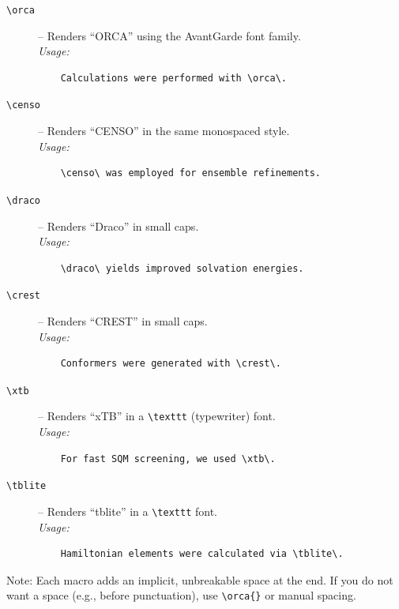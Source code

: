 \documentclass[a4paper,12pt]{article}
\begin{document}
\begin{description}
  \item[\texttt{\textbackslash orca}]  – Renders ``ORCA'' using the AvantGarde font family.\\
    \textit{Usage:} 
    \begin{verbatim}
    Calculations were performed with \orca\.
    \end{verbatim}

  \item[\texttt{\textbackslash censo}] – Renders “CENSO” in the same monospaced style.\\
    \textit{Usage:} 
    \begin{verbatim}
    \censo\ was employed for ensemble refinements.
    \end{verbatim}

    \item[\texttt{\textbackslash draco}] – Renders “Draco” in small caps.\\
    \textit{Usage:}
    \begin{verbatim}
    \draco\ yields improved solvation energies.
    \end{verbatim}

    \item[\texttt{\textbackslash crest}] – Renders “CREST” in small caps.\\
    \textit{Usage:}
    \begin{verbatim}
    Conformers were generated with \crest\.
    \end{verbatim}

    \item[\texttt{\textbackslash xtb}]   – Renders “xTB” in a \verb|\texttt| (typewriter) font.\\
    \textit{Usage:}
    \begin{verbatim}
    For fast SQM screening, we used \xtb\.
    \end{verbatim}

    \item[\texttt{\textbackslash tblite}] – Renders “tblite” in a \verb|\texttt| font.\\
    \textit{Usage:}
    \begin{verbatim}
    Hamiltonian elements were calculated via \tblite\.
    \end{verbatim}
\end{description}

\noindent Note: Each macro adds an implicit, unbreakable space at the end. If you do not want a space (e.g., before punctuation), use \verb|\orca{}| or manual spacing.
\end{document}
